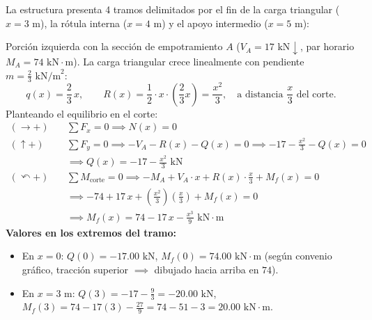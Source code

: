 
La estructura presenta 4 tramos delimitados por el fin de la carga triangular ($x=3\text{ m}$), la rótula interna ($x=4\text{ m}$) y el apoyo intermedio ($x=5\text{ m}$):

Porción izquierda con la sección de empotramiento $A$ ($V_A = 17\text{ kN}\downarrow$, par horario $M_A = 74\text{ kN}\cdot\text{m}$).
La carga triangular crece linealmente con pendiente $m = \frac{2}{3}\text{ kN/m}^2$:
\[
    q(x) = \frac{2}{3}\,x, \qquad R(x) = \frac{1}{2} \cdot x \cdot \left(\frac{2}{3}x\right) = \frac{x^2}{3}, \quad \text{a distancia } \frac{x}{3} \text{ del corte.}
\]
Planteando el equilibrio en el corte:
\begin{align*}
    (\rightarrow +) \quad &\sum F_x = 0 \implies \boxed{N(x) = 0} \\
    (\uparrow +) \quad &\sum F_y = 0 \implies -V_A - R(x) - Q(x) = 0 \implies -17 - \frac{x^2}{3} - Q(x) = 0 \\
    &\implies \boxed{Q(x) = -17 - \frac{x^2}{3}\text{ kN}} \\
    (\curvearrowleft +) \quad &\sum M_{\text{corte}} = 0 \implies -M_A + V_A \cdot x + R(x) \cdot \frac{x}{3} + M_f(x) = 0 \\
    &\implies -74 + 17\,x + \left(\frac{x^2}{3}\right)\left(\frac{x}{3}\right) + M_f(x) = 0 \\
    &\implies \boxed{M_f(x) = 74 - 17\,x - \frac{x^3}{9}\text{ kN}\cdot\text{m}}
\end{align*}
\textbf{Valores en los extremos del tramo:}
\begin{itemize}
    \item En $x = 0$: $Q(0) = -17.00\text{ kN}$, \quad $M_f(0) = 74.00\text{ kN}\cdot\text{m}$ (según convenio gráfico, tracción superior $\implies$ dibujado hacia arriba en $74$).
    \item En $x = 3\text{ m}$: $Q(3) = -17 - \frac{9}{3} = -20.00\text{ kN}$, \quad $M_f(3) = 74 - 17(3) - \frac{27}{9} = 74 - 51 - 3 = 20.00\text{ kN}\cdot\text{m}$.
\end{itemize}

